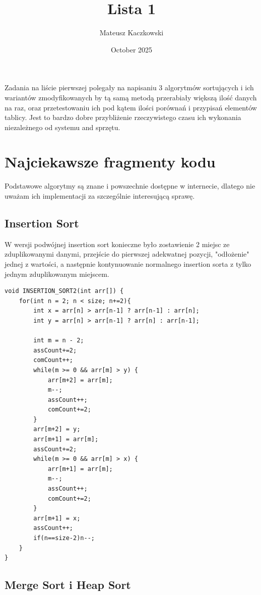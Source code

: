 \documentclass{article}
\title{Lista 1}
\author{Mateusz Kaczkowski}
\date{October 2025}
\begin{document}
\maketitle

Zadania na liście pierwszej polegały na napisaniu 3 algorytmów sortujących i ich wariantów zmodyfikowanych by tą samą metodą przerabiały większą ilość danych na raz, oraz przetestowaniu ich pod kątem ilości porównań i przypisań elementów tablicy. Jest to bardzo dobre przybliżenie rzeczywistego czasu ich wykonania niezależnego od systemu and sprzętu.

\section{Najciekawsze fragmenty kodu}

Podstawowe algorytmy są znane i powszechnie dostępne w internecie, dlatego nie uważam ich implementacji za szczególnie interesującą sprawę.

\subsection{Insertion Sort}

W wersji podwójnej insertion sort konieczne było zostawienie 2 miejsc ze zduplikowanymi danymi, przejście do pierwszej adekwatnej pozycji, "odłożenie" jednej z wartości, a następnie kontynuowanie normalnego insertion sorta z tylko jednym zduplikowanym miejscem.

\begin{verbatim}
void INSERTION_SORT2(int arr[]) {
    for(int n = 2; n < size; n+=2){
        int x = arr[n] > arr[n-1] ? arr[n-1] : arr[n];
        int y = arr[n] > arr[n-1] ? arr[n] : arr[n-1];
        
        int m = n - 2; 
        assCount+=2; 
        comCount++;
        while(m >= 0 && arr[m] > y) {
            arr[m+2] = arr[m];
            m--;
            assCount++;
            comCount+=2;
        }
        arr[m+2] = y;
        arr[m+1] = arr[m];
        assCount+=2;
        while(m >= 0 && arr[m] > x) {
            arr[m+1] = arr[m];
            m--;
            assCount++;
            comCount+=2;
        }
        arr[m+1] = x;
        assCount++;
        if(n==size-2)n--;
    }
}
\end{verbatim}

\subsection{Merge Sort i Heap Sort}
\end{document}
